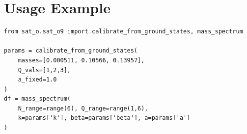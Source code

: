 \documentclass[12pt]{article}
\begin{document}
\section*{Usage Example}
\begin{verbatim}
from sat_o.sat_o9 import calibrate_from_ground_states, mass_spectrum

params = calibrate_from_ground_states(
    masses=[0.000511, 0.10566, 0.13957],
    Q_vals=[1,2,3],
    a_fixed=1.0
)
df = mass_spectrum(
    N_range=range(6), Q_range=range(1,6),
    k=params['k'], beta=params['beta'], a=params['a']
)
\end{verbatim}
\end{document}
